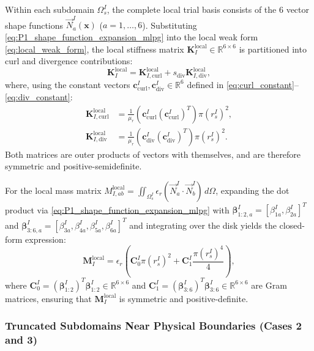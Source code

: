 \documentclass[VANCOUVER,Times1COL]{WileyNJD-v5}
\begin{document}
Within each subdomain $\Omega_s^I$, the complete local trial basis consists of the 6 vector shape functions $\vec{N}_a^I(\mathbf{x})$ ($a=1,\dots,6$). Substituting \eqref{eq:P1_shape_function_expansion_mlpg} into the local weak form \eqref{eq:local_weak_form}, the local stiffness matrix $\mathbf{K}_I^{\mathrm{local}} \in \mathbb{R}^{6 \times 6}$ is partitioned into curl and divergence contributions:
\begin{equation}
    \mathbf{K}_I^{\mathrm{local}} = \mathbf{K}_{I, \mathrm{curl}}^{\mathrm{local}} + s_{\mathrm{div}} \mathbf{K}_{I, \mathrm{div}}^{\mathrm{local}},
\end{equation}
where, using the constant vectors $\mathbf{c}_{\mathrm{curl}}^I, \mathbf{c}_{\mathrm{div}}^I \in \mathbb{R}^6$ defined in \eqref{eq:curl_constant}--\eqref{eq:div_constant}:
\begin{align}
    \mathbf{K}_{I, \mathrm{curl}}^{\mathrm{local}} & = \frac{1}{\mu_r} \left( \mathbf{c}_{\mathrm{curl}}^I (\mathbf{c}_{\mathrm{curl}}^I)^T \right) \pi (r_s^I)^2, \label{eq:k_curl_analytic} \\
    \mathbf{K}_{I, \mathrm{div}}^{\mathrm{local}}  & = \frac{1}{\mu_r} \left( \mathbf{c}_{\mathrm{div}}^I (\mathbf{c}_{\mathrm{div}}^I)^T \right) \pi (r_s^I)^2. \label{eq:k_div_analytic}
\end{align}
Both matrices are outer products of vectors with themselves, and are therefore symmetric and positive-semidefinite.

For the local mass matrix $M_{I, ab}^{\mathrm{local}} = \iint_{\Omega_s^I} \epsilon_r (\vec{N}_a^I \cdot \vec{N}_b^I) \, d\Omega$, expanding the dot product via \eqref{eq:P1_shape_function_expansion_mlpg} with $\boldsymbol{\beta}_{1:2, a}^I = [\beta_{1a}^I, \beta_{2a}^I]^T$ and $\boldsymbol{\beta}_{3:6, a}^I = [\beta_{3a}^I, \beta_{4a}^I, \beta_{5a}^I, \beta_{6a}^I]^T$ and integrating over the disk yields the closed-form expression:
\begin{equation}
    \mathbf{M}_I^{\mathrm{local}} = \epsilon_r \left( \mathbf{C}_0^I \pi (r_s^I)^2 + \mathbf{C}_1^I \frac{\pi (r_s^I)^4}{4} \right),
    \label{eq:m_local_analytic}
\end{equation}
where $\mathbf{C}_0^I = (\boldsymbol{\beta}_{1:2}^I)^T \boldsymbol{\beta}_{1:2}^I \in \mathbb{R}^{6 \times 6}$ and $\mathbf{C}_1^I = (\boldsymbol{\beta}_{3:6}^I)^T \boldsymbol{\beta}_{3:6}^I \in \mathbb{R}^{6 \times 6}$ are Gram matrices, ensuring that $\mathbf{M}_I^{\mathrm{local}}$ is symmetric and positive-definite.

\subsubsection{Truncated Subdomains Near Physical Boundaries (Cases 2 and 3)}
\label{subsubsec:truncated_subdomains_analytic}
\end{document}
